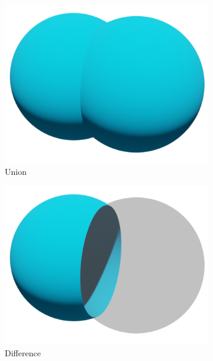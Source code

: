 \begin{figure}
	\centering
	\begin{subfigure}[t]{0.3\textwidth}
		\centering
		\includegraphics[width=\textwidth]{Images/Union}
		\caption{Union}
	\end{subfigure}
	\hfill
	\begin{subfigure}[t]{0.3\textwidth}
		\centering
		\includegraphics[width=\textwidth]{Images/Difference}
		\caption{Difference}
	\end{subfigure}
	\hfill
	\begin{subfigure}[t]{0.3\textwidth}
		\centering

\end{subfigure}
\end{figure}

